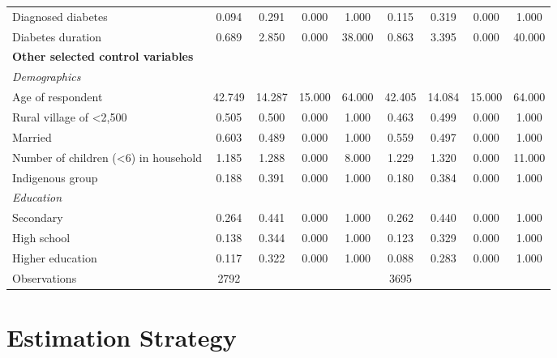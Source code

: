 \documentclass[12pt,english,british]{article}
\begin{document}
\begin{table}[h!]
\begin{center}
\begin{adjustbox}{max width=\textwidth}
{\begin{tabular}{l*{2}{cccc}}
Diagnosed diabetes  &       0.094&       0.291&       0.000&       1.000&       0.115&       0.319&       0.000&       1.000\\
Diabetes duration   &       0.689&       2.850&       0.000&      38.000&       0.863&       3.395&       0.000&      40.000\\
\textbf{Other selected control variables} &&&&&&&& \\
\hspace*{10mm}\emph{Demographics}&&&&&&&& \\
Age of respondent   &      42.749&      14.287&      15.000&      64.000&      42.405&      14.084&      15.000&      64.000\\
Rural village of <2,500&       0.505&       0.500&       0.000&       1.000&       0.463&       0.499&       0.000&       1.000\\
Married             &       0.603&       0.489&       0.000&       1.000&       0.559&       0.497&       0.000&       1.000\\
Number of children (<6) in household&       1.185&       1.288&       0.000&       8.000&       1.229&       1.320&       0.000&      11.000\\
Indigenous group    &       0.188&       0.391&       0.000&       1.000&       0.180&       0.384&       0.000&       1.000\\
\hspace*{10mm}\emph{Education}&&&&&&&& \\
Secondary           &       0.264&       0.441&       0.000&       1.000&       0.262&       0.440&       0.000&       1.000\\
High school         &       0.138&       0.344&       0.000&       1.000&       0.123&       0.329&       0.000&       1.000\\
Higher education    &       0.117&       0.322&       0.000&       1.000&       0.088&       0.283&       0.000&       1.000\\
\midrule
Observations        &        2792&            &            &            &        3695&            &            &            \\
\bottomrule
\end{tabular}%
}
\end{adjustbox}
\end{center}
\end{table}  
  


\section{\label{sec:Estimation Strategy}Estimation Strategy}
\end{document}
